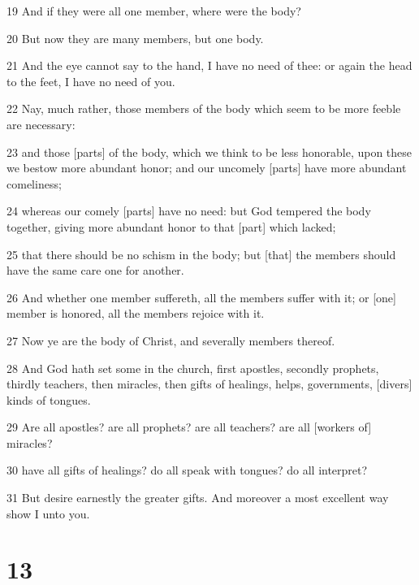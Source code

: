 \par 19 And if they were all one member, where were the body?
\par 20 But now they are many members, but one body.
\par 21 And the eye cannot say to the hand, I have no need of thee: or again the head to the feet, I have no need of you.
\par 22 Nay, much rather, those members of the body which seem to be more feeble are necessary:
\par 23 and those [parts] of the body, which we think to be less honorable, upon these we bestow more abundant honor; and our uncomely [parts] have more abundant comeliness;
\par 24 whereas our comely [parts] have no need: but God tempered the body together, giving more abundant honor to that [part] which lacked;
\par 25 that there should be no schism in the body; but [that] the members should have the same care one for another.
\par 26 And whether one member suffereth, all the members suffer with it; or [one] member is honored, all the members rejoice with it.
\par 27 Now ye are the body of Christ, and severally members thereof.
\par 28 And God hath set some in the church, first apostles, secondly prophets, thirdly teachers, then miracles, then gifts of healings, helps, governments, [divers] kinds of tongues.
\par 29 Are all apostles? are all prophets? are all teachers? are all [workers of] miracles?
\par 30 have all gifts of healings? do all speak with tongues? do all interpret?
\par 31 But desire earnestly the greater gifts. And moreover a most excellent way show I unto you.

\chapter{13}

